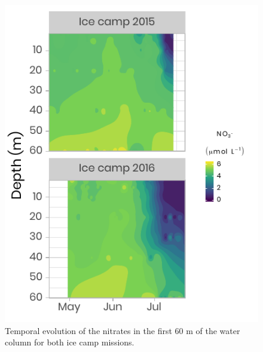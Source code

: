 \documentclass[12pt,a4paper]{scrartcl}
\begin{document}
\begin{figure}[h]
	\centering
	\includegraphics[scale = 2]{../../../graphs/fig08.pdf}
	\caption{Temporal evolution of the nitrates in the first 60 m of the water column for both ice camp missions.}
\end{figure}

\clearpage
\newpage
\end{document}
